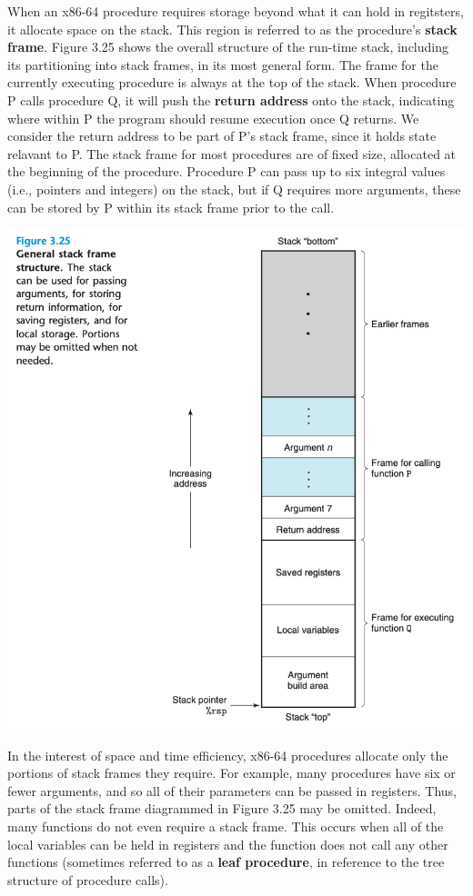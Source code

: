 \documentclass[11pt]{article}
\begin{document}
When an x86-64 procedure requires storage beyond what it can hold in regitsters, it allocate space on the stack. This region is referred to as the procedure's \textbf{stack frame}. Figure 3.25 shows the overall structure of the run-time stack, including its partitioning into stack frames, in its most general form. The frame for the currently executing procedure is always at the top of the stack. When procedure P calls procedure Q, it will push the \textbf{return address} onto the stack, indicating where within P the program should resume execution once Q returns. We consider the return address to be part of P's stack frame, since it holds state relavant to P. The stack frame for most procedures are of fixed size, allocated at the beginning of the procedure. Procedure P can pass up to six integral values (i.e., pointers and integers) on the stack, but if Q requires more arguments, these can be stored by P within its stack frame prior to the call.\\

\begin{center}
\includegraphics[width=.9\linewidth]{pics/general-stack-frame-structure.png}
\end{center}


In the interest of space and time efficiency, x86-64 procedures allocate only the portions of stack frames they require. For example, many procedures have six or fewer arguments, and so all of their parameters can be passed in registers. Thus, parts of the stack frame diagrammed in Figure 3.25 may be omitted. Indeed, many functions do not even require a stack frame. This occurs when all of the local variables can be held in registers and the function does not call any other functions (sometimes referred to as a \textbf{leaf procedure}, in reference to the tree structure of procedure calls).\\
\end{document}
